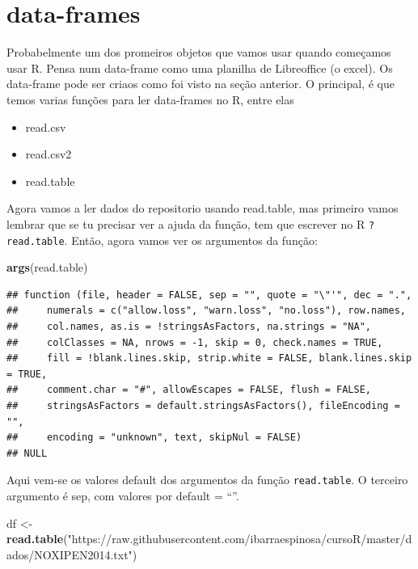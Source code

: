\documentclass[]{book}
\newenvironment{Shaded}{\begin{snugshade}}{\end{snugshade}}
\newcommand{\KeywordTok}[1]{\textcolor[rgb]{0.13,0.29,0.53}{\textbf{#1}}}
\newcommand{\StringTok}[1]{\textcolor[rgb]{0.31,0.60,0.02}{#1}}
\newcommand{\NormalTok}[1]{#1}
\providecommand{\tightlist}{%
  \setlength{\itemsep}{0pt}\setlength{\parskip}{0pt}}
\begin{document}
\section{data-frames}\label{data-frames}

Probabelmente um dos promeiros objetos que vamos usar quando começamos
usar R. Pensa num data-frame como uma planilha de Libreoffice (o excel).
Os data-frame pode ser criaos como foi visto na seção anterior. O
principal, é que temos varias funções para ler data-frames no R, entre
elas

\begin{itemize}
\tightlist
\item
  read.csv
\item
  read.csv2
\item
  read.table
\end{itemize}

Agora vamos a ler dados do repositorio usando read.table, mas primeiro
vamos lembrar que se tu precisar ver a ajuda da função, tem que escrever
no R \texttt{?read.table}. Então, agora vamos ver os argumentos da
função:

\begin{Shaded}
\begin{Highlighting}[]
\KeywordTok{args}\NormalTok{(read.table)}
\end{Highlighting}
\end{Shaded}

\begin{verbatim}
## function (file, header = FALSE, sep = "", quote = "\"'", dec = ".", 
##     numerals = c("allow.loss", "warn.loss", "no.loss"), row.names, 
##     col.names, as.is = !stringsAsFactors, na.strings = "NA", 
##     colClasses = NA, nrows = -1, skip = 0, check.names = TRUE, 
##     fill = !blank.lines.skip, strip.white = FALSE, blank.lines.skip = TRUE, 
##     comment.char = "#", allowEscapes = FALSE, flush = FALSE, 
##     stringsAsFactors = default.stringsAsFactors(), fileEncoding = "", 
##     encoding = "unknown", text, skipNul = FALSE) 
## NULL
\end{verbatim}

Aqui vem-se os valores default dos argumentos da função
\texttt{read.table}. O terceiro argumento é sep, com valores por default
= ``''.

\begin{Shaded}
\begin{Highlighting}[]
\NormalTok{df <-}\StringTok{ }\KeywordTok{read.table}\NormalTok{(}\StringTok{"https://raw.githubusercontent.com/ibarraespinosa/cursoR/master/dados/NOXIPEN2014.txt"}\NormalTok{)}
\end{Highlighting}
\end{Shaded}
\end{document}
